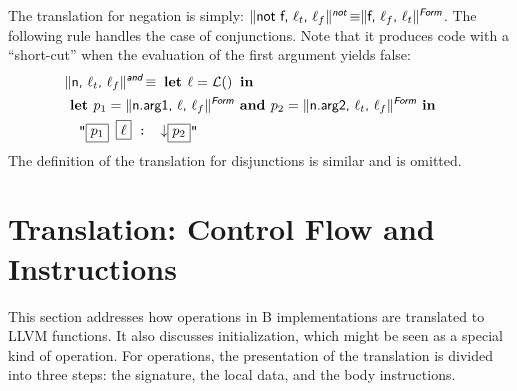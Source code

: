\documentclass{llncs}
\newcommand{\trad}[2]{\ensuremath{\lVert \textsf{#1} \rVert^{\textit{#2}}}}
\newcommand{\nl}[0]{\ensuremath{\downarrow}}
\DeclareMathOperator{\isdef}{\equiv}
\DeclareMathOperator{\lbl}{\mathcal{L}()}
\newcommand{\llvm}[1]{\texttt{#1}}
\newcommand{\B}[1]{\textsf{#1}}
\newcommand{\LET}[0]{\textbf{ let }}
\newcommand{\IN}[0]{\textbf{ in }}
\newcommand{\AND}[0]{\textbf{ and }}
\newcommand{\PH}[1]{\framebox{$#1$}}
\begin{document}
\begin{enumerate}
\noindent The translation for negation is simply: $\trad{not f, $\ell_t$,
  $\ell_f$}{\B{not}} \isdef \trad{f, $\ell_f$, $\ell_t$}{\B{Form}}$.  The
following rule handles the case of conjunctions. Note that it produces code with
a ``short-cut'' when the evaluation of the first argument yields false:
\begin{align*}
\begin{split}
  \lefteqn{\trad{n, $\ell_t$, $\ell_f$}{\B{and}} \isdef \LET \ell = \lbl \IN} \\
  & \LET p_1 = \trad{n.arg1, $\ell$, $\ell_f$}{\B{Form}}
  \AND p_2 = \trad{n.arg2, $\ell_t$, $\ell_f$}{\B{Form}} \IN \\
  & \quad \llvm{"\PH{p_1} \PH{\ell} :  \nl \PH{p_2}"}
\end{split}
\end{align*}
The definition of the translation for disjunctions is similar and is omitted.

\section{Translation: Control Flow and Instructions
\label{sec:control}}

This section addresses how operations in B implementations are translated to
LLVM functions. It also discusses initialization, which might be seen as a
special kind of operation. For operations, the presentation of the translation
is divided into three steps: the signature, the local data, and the body
instructions.


\end{enumerate}
\end{document}
